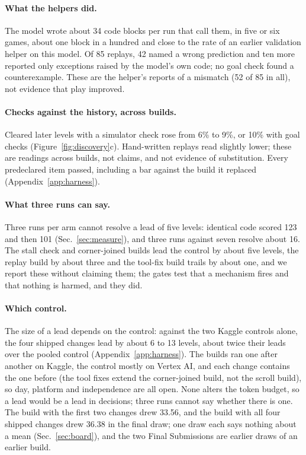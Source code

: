 \paragraph{What the helpers did.}
The model wrote about 34 code blocks per run that call them, in five or six games, about one block in a hundred and close to the rate of an earlier validation helper on this model. %
Of 85 replays, 42 named a wrong prediction and ten more reported only exceptions raised by the model's own code; no goal check found a counterexample. These are the helper's reports of a mismatch (52 of 85 in all), not evidence that play improved. %

\paragraph{Checks against the history, across builds.}
Cleared later levels with a simulator check rose from 6\% to 9\%, or 10\% with goal checks (Figure~\ref{fig:discovery}c).
Hand-written replays read slightly lower; these are readings across builds, not claims, and not evidence of substitution. %
Every predeclared item passed, including a bar against the build it replaced (Appendix~\ref{app:harness}). %

\paragraph{What three runs can say.}
Three runs per arm cannot resolve a lead of five levels: identical code scored 123 and then 101 (Sec.~\ref{sec:measure}), and three runs against seven resolve about 16. %
The stall check and corner-joined builds lead the control by about five levels, the replay build by about three and the tool-fix build trails by about one, and we report these without claiming them; the gates test that a mechanism fires and that nothing is harmed, and they did. %
\paragraph{Which control.}
The size of a lead depends on the control: against the two Kaggle controls alone, the four shipped changes lead by about 6 to 13 levels, about twice their leads over the pooled control (Appendix~\ref{app:harness}).
The builds ran one after another on Kaggle, the control mostly on Vertex AI, and each change contains the one before (the tool fixes extend the corner-joined build, not the scroll build), so day, platform and independence are all open.
None alters the token budget, so a lead would be a lead in decisions; three runs cannot say whether there is one.
The build with the first two changes drew 33.56, and the build with all four shipped changes drew 36.38 in the final draw; one draw each says nothing about a mean (Sec.~\ref{sec:board}), and the two Final Submissions are earlier draws of an earlier build. %

